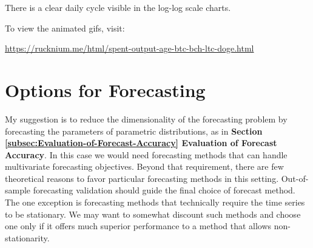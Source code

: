 \documentclass[english]{article}
\begin{document}
There is a clear daily cycle visible in the log-log scale charts.

To view the animated gifs, visit:

\href{https://rucknium.me/html/spent-output-age-btc-bch-ltc-doge.html}{https://rucknium.me/html/spent-output-age-btc-bch-ltc-doge.html}

\section{Options for Forecasting\label{sec:Options-for-Forecasting}}

My suggestion is to reduce the dimensionality of the forecasting problem
by forecasting the parameters of parametric distributions, as in \textbf{Section
\ref{subsec:Evaluation-of-Forecast-Accuracy} Evaluation of Forecast
Accuracy}. In this case we would need forecasting methods that can
handle multivariate forecasting objectives. Beyond that requirement,
there are few theoretical reasons to favor particular forecasting
methods in this setting. Out-of-sample forecasting validation should
guide the final choice of forecast method. The one exception is forecasting
methods that technically require the time series to be stationary.
We may want to somewhat discount such methods and choose one only
if it offers much superior performance to a method that allows non-stationarity.
\end{document}
